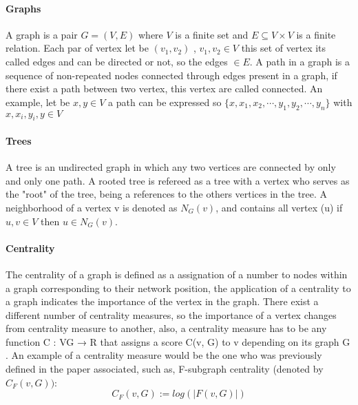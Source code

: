 

\paragraph{Graphs} A graph is a pair $G = (V, E)$ where $V$ is a finite set and $E \subseteq V\times V$ is a finite relation. Each par of vertex let be $(v_{1},v_{2})$ , $v_{1},v_{2} \in V$ this set of vertex its called edges and can be directed or not, so the edges $\in E$. A path in a graph is a sequence of non-repeated nodes connected through edges present in a graph, if there exist a path between two vertex, this vertex are called connected. An example, let be $x,y \in V$ a path can be expressed so $\{x,x_{1},x_{2},\cdots,y_{1},y_{2},\cdots,y_{n} \}$ with $x,x_{i},y_{i},y \in V$

\paragraph{Trees} A tree is an undirected graph in which any two vertices are connected by only and only one path. A rooted tree is refereed as a tree with a vertex who serves as the "root" of the tree, being a references to the others  vertices in the tree. A neighborhood of a vertex v is denoted as $N_{G}(v)$, and contains all vertex (u) if ${u,v} \in V$ then $u \in N_{G}(v)$.

\paragraph{Centrality} The centrality of a graph is defined as a assignation of a number to nodes within a graph corresponding to their network position, the application of a centrality to a graph indicates the importance of the vertex in the graph. There exist a different number of centrality measures, so the importance of a vertex changes from centrality measure to another, also, a centrality measure has to be any function C : VG → R that assigns a score C(v, G) to v depending on its graph G . An example of a centrality measure would be the one who was previously defined in the paper associated, such as, F-subgraph
centrality (denoted by $C_{F} (v, G))$:
\begin{equation}
    C_{F} (v, G) := log (|F(v, G)|)
\end{equation}
